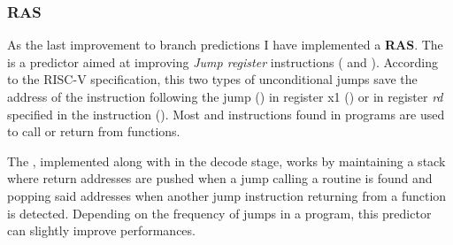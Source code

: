 \documentclass[12pt,oneside,a4paper]{article}
\begin{document}
\subsubsection{RAS}

As the last improvement to branch predictions I have implemented a \textbf{RAS}. The {\selectfont{Return Address Stack}} is a predictor aimed at improving \textit{Jump register} instructions ({\selectfont{JALR}} and {\selectfont{JAL}}). According to the RISC-V specification, this two types of unconditional jumps save the address of the instruction following the jump ({\selectfont{pc+4}}) in register x1 ({\selectfont{JAL}}) or in  register \textit{rd} specified in the instruction ({\selectfont{JALR}}). Most {\selectfont{JAL}} and {\selectfont{JALR}} instructions found in programs are used to call or return from functions.

The {\selectfont{RAS}}, implemented along with {\selectfont{BHT}} in the decode stage, works by maintaining a stack where return addresses are pushed when a jump calling a routine is found and popping said addresses when another jump instruction returning from a function is detected. Depending on the frequency of jumps in a program, this predictor can slightly improve performances. 



\printbibliography
\end{document}
